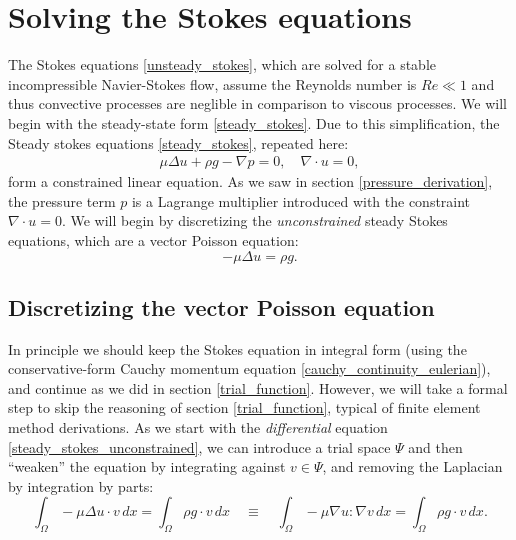\section{Solving the Stokes equations}
The Stokes equations \eqref{unsteady_stokes}, which are solved for a stable incompressible Navier-Stokes flow,
assume the Reynolds number is $Re \ll 1$ and thus convective processes are neglible in comparison to viscous processes.
We will begin with the steady-state form \eqref{steady_stokes}.
Due to this simplification, the Steady stokes equations \eqref{steady_stokes}, repeated here:
\begin{align*}
    \mu\Delta u + \rho g - \nabla p = 0,\quad \nabla\cdot u = 0,
\end{align*}
form a constrained linear equation. As we saw in section \ref{pressure_derivation}, the pressure term $p$ is a Lagrange multiplier introduced
with the constraint $\nabla\cdot u = 0$. We will begin by discretizing the \textit{unconstrained} steady Stokes equations,
which are a vector Poisson equation:
\begin{equation}\label{steady_stokes_unconstrained}
    -\mu\Delta u = \rho g.
\end{equation}
\subsection{Discretizing the vector Poisson equation}\label{discretizing_vector_poisson}
In principle we should keep the Stokes equation
in integral form (using the conservative-form Cauchy momentum equation \eqref{cauchy_continuity_eulerian}), and continue as we did
in section \ref{trial_function}. However,
we will take a formal step to skip the reasoning of section \ref{trial_function}, typical of finite element method derivations.
As we start with the \textit{differential} equation \eqref{steady_stokes_unconstrained}, we can introduce a trial space $\Psi$ and then ``weaken''
the equation by integrating against $v \in \Psi$, and removing the Laplacian by integration by parts:
\begin{equation}\label{steady_stokes_unconstrained_weak}
    \int_\Omega -\mu\Delta u\cdot v\,dx = \int_\Omega \rho g\cdot v\,dx
    \quad\equiv\quad
    \int_\Omega -\mu\nabla u : \nabla v\,dx = \int_\Omega \rho g\cdot v\,dx.
\end{equation}

